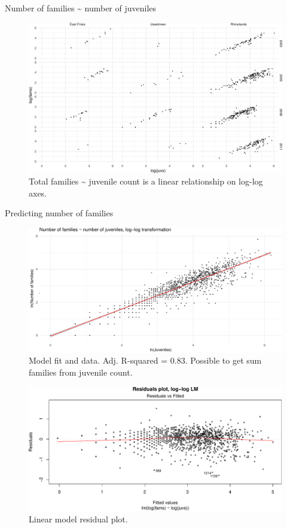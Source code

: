 \documentclass[10pt,ignorenonframetext,]{beamer}
\begin{document}
\begin{frame}{Number of families \textasciitilde{} number of juveniles}

\begin{figure}[htbp]
\centering
\includegraphics{goose_code008pres_files/figure-beamer/loglogfamsjuvs-1.pdf}
\caption{Total families \textasciitilde{} juvenile count is a linear
relationship on log-log axes.}
\end{figure}

\end{frame}

\begin{frame}{Predicting number of families}

\begin{figure}[htbp]
\centering
\includegraphics{goose_code008pres_files/figure-beamer/scatterplot_lm1_fams_juvs-1.pdf}
\caption{Model fit and data. Adj. R-squared = 0.83. Possible to get sum
families from juvenile count.}
\end{figure}

\end{frame}

\begin{frame}

\begin{figure}[htbp]
\centering
\includegraphics{goose_code008pres_files/figure-beamer/compare_nls_lm_resids-1.pdf}
\caption{Linear model residual plot.}
\end{figure}

\end{frame}
\end{document}
